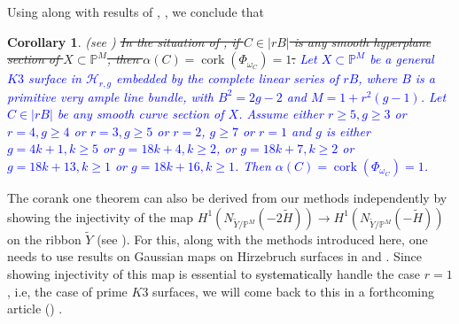 \documentclass[11pt,twoside]{amsart}
\theoremstyle{plain}
\numberwithin{equation}{section}
\newtheorem{corollary}[theorem]{Corollary}
\theoremstyle{definition}
\newtheorem{definition}[theorem]{Definition}
\begin{document}





\vspace{0.2cm}

\par

Using  along with results of \cite{CDS20}, \cite{ABS17}, we conclude that 
\begin{corollary}\label{corank one intro}(see )
\sout{In the situation of , if $C \in |rB|$ is any smooth hyperplane section of $X \subset \mathbb{P}^M$, then $\alpha(C) = \operatorname{cork}(\Phi_{\omega_C}) = 1$.}
\textcolor{blue}{Let $X \subset \mathbb{P}^{M}$ be a general $K3$ surface in $\mathcal{H}_{r,g}$ embedded by the complete linear series of $rB$, where $B$ is a primitive very ample line bundle, with $B^2 = 2g-2$ and $M = 1+r^2(g-1)$. Let $C \in |rB|$ be any smooth curve section of $X$. Assume either $r \geq 5, g \geq 3$ or $r = 4, g \geq 4$ or $r = 3, g \geq 5$ or $r = 2$, $g \geq 7$ or $r = 1$ and $g$ is either $g = 4k+1, k \geq 5$ or $g = 18k+4, k \geq 2$, or $g = 18k+7, k \geq 2$ or $g = 18k+13, k \geq 1$ or $g = 18k+16, k \geq 1$. Then $\alpha(C) = \operatorname{cork}(\Phi_{\omega_C}) = 1$.}
\end{corollary}
The corank one theorem can also be derived from our methods  independently by showing the injectivity of the map $H^1(N_{\widetilde{Y}/\mathbb{P}^M}(-2\widetilde{H})) \to H^1(N_{\widetilde{Y}/\mathbb{P}^M}(-\widetilde{H}))$ on the ribbon $\widetilde{Y}$ (see  ). For this, along with the methods introduced here, one needs to use results on Gaussian maps on Hirzebruch surfaces in \cite{DM92} and \cite{DP12}. Since showing injectivity of this map is essential to \textcolor{black}{systematically} handle the case $r = 1$, i.e, the case of prime $K3$ surfaces, we will come back to this in a forthcoming article (\cite{BM25}) . 
\end{document}

